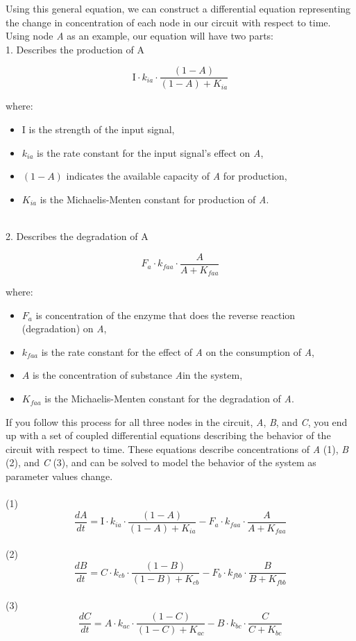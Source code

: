 \documentclass{article}
\begin{document}
Using this general equation, we can construct a differential equation representing the change in concentration of each node in our circuit with respect to time. Using node \textit{A} as an example, our equation will have two parts:
\\

1. Describes the production of A

\[
\text{I} \cdot k_{ia} \cdot \frac{(1 - A)}{(1 - A) + K_{ia}}
\]


where:
\begin{itemize}
    \item \(\text{I}\) is the strength of the input signal,
    \item \(k_{ia}\) is the rate constant for the input signal's effect on \textit{A},
    \item \((1 - A)\) indicates the available capacity of \textit{A} for production,
    \item \(K_{ia}\) is the Michaelis-Menten constant for production of \textit{A}.
\end{itemize}
\\
2. Describes the degradation of A

\[
F_a \cdot k_{faa} \cdot \frac{A}{A + K_{faa}}
\]

where:
\begin{itemize}
    \item \(F_a\) is concentration of the enzyme that does the reverse reaction (degradation) on \textit{A},
    \item \(k_{faa}\) is the rate constant for the effect of \textit{A} on the consumption of \textit{A},
    \item \(A\) is the concentration of substance \textit{A}in the system,
    \item \(K_{faa}\) is the Michaelis-Menten constant for the degradation of \textit{A}.
\end{itemize}



If you follow this process for all three nodes in the circuit, \textit{A}, \textit{B}, and \textit{C}, you end up with a set of coupled differential equations describing the behavior of the circuit with respect to time. These equations describe concentrations of \textit{A} (1), \textit{B} (2), and \textit{C} (3), and can be solved to model the behavior of the system as parameter values change. 
\\
\\
(1)
\[
\frac{dA}{dt} = \text{I} \cdot k_{ia} \cdot \frac{(1 - A)}{(1 - A) + K_{ia}} - F_a \cdot k_{faa} \cdot \frac{A}{A + K_{faa}}
\]
\\
(2)
\[
\frac{dB}{dt} = C \cdot k_{cb} \cdot \frac{(1 - B)}{(1 - B) + K_{cb}} - F_b \cdot k_{fbb} \cdot \frac{B}{B + K_{fbb}}
\]
\\
(3)
\[
\frac{dC}{dt} = A \cdot k_{ac} \cdot \frac{(1 - C)}{(1 - C) + K_{ac}} - B \cdot k_{bc} \cdot \frac{C}{C + K_{bc}}
\]
\end{document}
